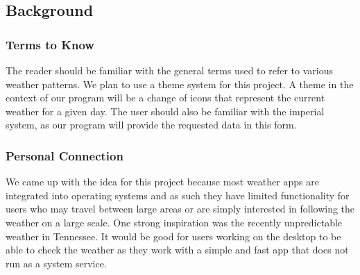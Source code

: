 \documentclass[10pt,conference,onecolumn,compsoc]{IEEEtran}
\begin{document}











\subsection{Background}
\subsubsection{Terms to Know}
	The reader should be familiar with the general terms used to refer to various weather patterns. We plan to use a theme system for this project. A theme in the context of our program will be a change of icons that represent the current weather for a given day.
The user should also be familiar with the imperial system, as our program will provide the requested data in this form.
\subsubsection{Personal Connection}	
	 We came up with the idea for this project because most weather apps are integrated into operating systems and as such they have limited functionality for users who may travel between large areas or are simply interested in following the weather on a large scale. One strong inspiration was the recently unpredictable weather in Tennessee. It would be good for users working on the desktop to be able to check the weather as they work with a simple and fast app that does not run as a system service. 
\end{document}
